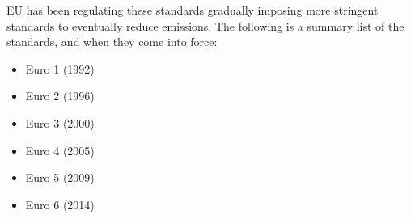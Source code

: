 EU has been regulating these standards gradually imposing more stringent standards to eventually reduce emissions. The following is a summary list of the standards, and when they come into force:
\begin{itemize}
	\item Euro 1 (1992)
	\item Euro 2 (1996)
	\item Euro 3 (2000)
	\item Euro 4 (2005)
	\item Euro 5 (2009)
	\item Euro 6 (2014)
\end{itemize}
